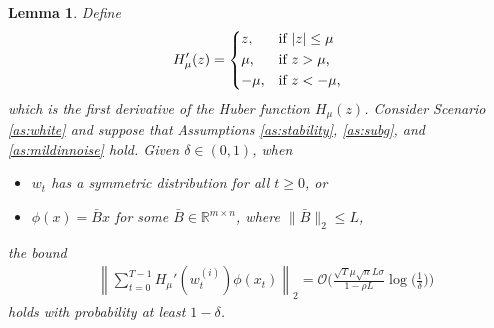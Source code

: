 \documentclass[letterpaper,10pt,conference]{ieeeconf}
\theoremstyle{plain} %
\newtheorem{lemma}{Lemma}
\theoremstyle{plain} %
\theoremstyle{plain} %
\theoremstyle{plain}
\begin{document}
\begin{lemma}\label{secondterm}
    Define 
 \begin{equation}\label{huberderivative}
       H_\mu'(z)=\begin{dcases*}
          z, & if $|z|\le \mu$\\
            \mu, & if $z> \mu$,\\
            -\mu, & if $z< -\mu$,
        \end{dcases*}
    \end{equation}
which is    the first derivative of the Huber function $H_\mu(z)$. 
  Consider Scenario \ref{as:white} and suppose that Assumptions \ref{as:stability}, \ref{as:subg},  and \ref{as:mildinnoise} hold. 
    Given $\delta\in(0,1)$, when 
    \begin{itemize}
       \item $w_t$ has a symmetric distribution for all $t\ge 0$, or
        \item $\phi(x) = \bar B x$ for some $\bar B\in\mathbb{R}^{m\times n}$, where $\|\bar B\|_2\le L$,
    \end{itemize}
    the bound
    \begin{align*}
      & \left\| \sum_{t=0}^{T-1} H_\mu'(w_t^{(i)}) \phi (x_t)\right\|_2= \mathcal{O}\biggr(\frac{\sqrt{T} \mu \sqrt{n}L\sigma}{1-\rho L}\log\Bigr(\frac{1}{\delta}\Bigr)\biggr)
    \end{align*}
holds with probability at least $1-\delta$.    
\end{lemma}
\end{document}
